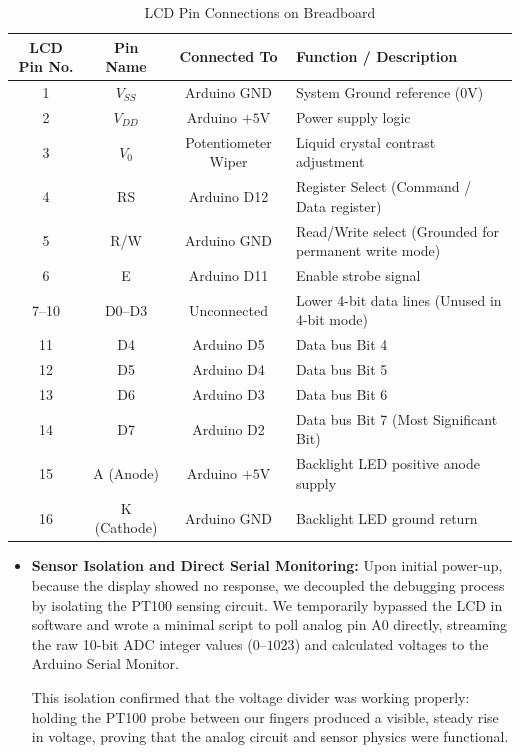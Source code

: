 \documentclass[journal,12pt,onecolumn]{IEEEtran}
\begin{document}
\begin{enumerate}
\begin{table}[H]
	\centering
	\caption{LCD Pin Connections on Breadboard}
	\label{tab:lcd_connections}
	\begin{tabular}{|c|c|c|l|}
		\hline
		\textbf{LCD Pin No.} & \textbf{Pin Name} & \textbf{Connected To} & \textbf{Function / Description} \\ \hline
		1 & $V_{SS}$ & Arduino $\text{GND}$ & System Ground reference ($0\text{V}$) \\ \hline
		2 & $V_{DD}$ & Arduino $+5\text{V}$ & Power supply logic \\ \hline
		3 & $V_0$ & Potentiometer Wiper & Liquid crystal contrast adjustment \\ \hline
		4 & RS & Arduino D12 & Register Select (Command / Data register) \\ \hline
		5 & R/W & Arduino $\text{GND}$ & Read/Write select (Grounded for permanent write mode) \\ \hline
		6 & E & Arduino D11 & Enable strobe signal \\ \hline
		7--10 & D0--D3 & Unconnected & Lower 4-bit data lines (Unused in 4-bit mode) \\ \hline
		11 & D4 & Arduino D5 & Data bus Bit 4 \\ \hline
		12 & D5 & Arduino D4 & Data bus Bit 5 \\ \hline
		13 & D6 & Arduino D3 & Data bus Bit 6 \\ \hline
		14 & D7 & Arduino D2 & Data bus Bit 7 (Most Significant Bit) \\ \hline
		15 & A (Anode) & Arduino $+5\text{V}$ & Backlight LED positive anode supply \\ \hline
		16 & K (Cathode) & Arduino $\text{GND}$ & Backlight LED ground return \\ \hline
	\end{tabular}
\end{table}

\begin{itemize}
	\item \textbf{Sensor Isolation and Direct Serial Monitoring:} Upon initial power-up, because the display showed no response, we decoupled the debugging process by isolating the PT100 sensing circuit. We temporarily bypassed the LCD in software and wrote a minimal script to poll analog pin A0 directly, streaming the raw 10-bit ADC integer values ($0\text{--}1023$) and calculated voltages to the Arduino Serial Monitor. 
	
	This isolation confirmed that the voltage divider was working properly: holding the PT100 probe between our fingers produced a visible, steady rise in voltage, proving that the analog circuit and sensor physics were functional.
\end{itemize}


\end{enumerate}
\end{document}
